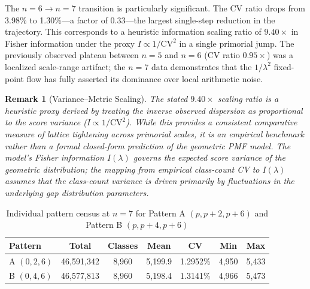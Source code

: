 \documentclass[11pt]{article}
\newtheorem{remark}{Remark}
\begin{document}
The $n=6 \rightarrow n=7$ transition is particularly significant. The CV ratio drops from 3.98\% to 1.30\%---a factor of $0.33$---the largest single-step reduction in the trajectory. This corresponds to a heuristic information scaling ratio of $9.40\times$ in Fisher information under the proxy $I \propto 1/\text{CV}^2$ in a single primorial jump. The previously observed plateau between $n=5$ and $n=6$ (CV ratio $0.95\times$) was a localized scale-range artifact; the $n=7$ data demonstrates that the $1/\lambda^2$ fixed-point flow has fully asserted its dominance over local arithmetic noise.

\begin{remark}[Variance--Metric Scaling]
The stated $9.40\times$ scaling ratio is a heuristic proxy derived by treating the inverse observed dispersion as proportional to the score variance ($I \propto 1/\text{CV}^2$). While this provides a consistent comparative measure of lattice tightening across primorial scales, it is an empirical benchmark rather than a formal closed-form prediction of the geometric PMF model. The model's Fisher information $I(\lambda)$ governs the expected score variance of the geometric distribution; the mapping from empirical class-count CV to $I(\lambda)$ assumes that the class-count variance is driven primarily by fluctuations in the underlying gap distribution parameters.
\end{remark}

\begin{table}[h]
\centering
\caption{Individual pattern census at $n=7$ for Pattern A $(p, p+2, p+6)$ and Pattern B $(p, p+4, p+6)$}
\label{tab:triplet_split}
\begin{tabular}{lcccccc}
\toprule
Pattern & Total & Classes & Mean & CV & Min & Max \\
\midrule
A $(0, 2, 6)$ & 46{,}591{,}342 & 8{,}960 & 5{,}199.9 & 1.2952\% & 4{,}950 & 5{,}433 \\
B $(0, 4, 6)$ & 46{,}577{,}813 & 8{,}960 & 5{,}198.4 & 1.3141\% & 4{,}966 & 5{,}473 \\
\bottomrule
\end{tabular}

\vspace{0.5em}
\end{table}
\end{document}
